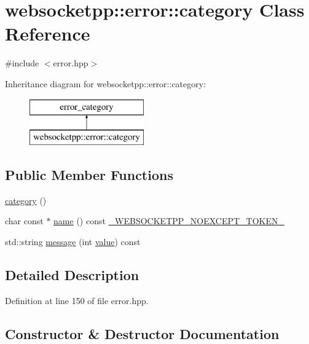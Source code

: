 \hypertarget{classwebsocketpp_1_1error_1_1category}{}\section{websocketpp\+:\+:error\+:\+:category Class Reference}
\label{classwebsocketpp_1_1error_1_1category}


{\ttfamily \#include $<$error.\+hpp$>$}

Inheritance diagram for websocketpp\+:\+:error\+:\+:category\+:\begin{figure}[H]
\begin{center}
\leavevmode
\includegraphics[height=2.000000cm]{classwebsocketpp_1_1error_1_1category}
\end{center}
\end{figure}
\subsection*{Public Member Functions}
\begin{DoxyCompactItemize}
\item 
\hyperlink{classwebsocketpp_1_1error_1_1category_a1bb85c82e564bfc962d1dbaf3e85d1eb}{category} ()
\item 
char const $\ast$ \hyperlink{classwebsocketpp_1_1error_1_1category_a3643effd7e637693fa04394d43c04621}{name} () const \hyperlink{boost__config_8hpp_aa19747404a5f2fe9c9eb9e9d2e48f26c}{\+\_\+\+W\+E\+B\+S\+O\+C\+K\+E\+T\+P\+P\+\_\+\+N\+O\+E\+X\+C\+E\+P\+T\+\_\+\+T\+O\+K\+E\+N\+\_\+}
\item 
std\+::string \hyperlink{classwebsocketpp_1_1error_1_1category_a71e998b98aab647e8b8aab97ae0e513a}{message} (int \hyperlink{namespacewebsocketpp_1_1error_a0558d884e44e79146ad4947aea63f68d}{value}) const 
\end{DoxyCompactItemize}


\subsection{Detailed Description}


Definition at line 150 of file error.\+hpp.



\subsection{Constructor \& Destructor Documentation}
\hypertarget{classwebsocketpp_1_1error_1_1category_a1bb85c82e564bfc962d1dbaf3e85d1eb}{}
